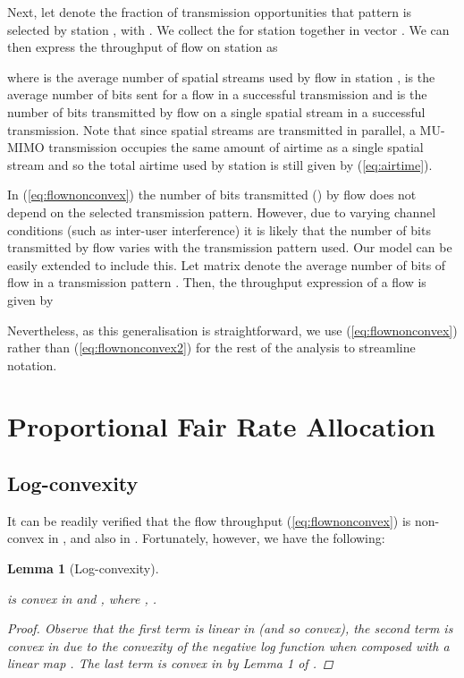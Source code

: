 \documentclass[11pt]{amsart}
\newtheorem{lemma}{Lemma}
\begin{document}
Next, let  denote the fraction of transmission opportunities that pattern  is selected by station , with .  We collect the  for station  together in vector . We can then express the throughput of flow  on station  as 

where  is the average number of spatial streams used by flow  in station ,  is the average number of bits sent for a flow  in a successful transmission and  is the number of bits transmitted by flow  on a single spatial stream in a successful transmission. Note that since spatial streams are transmitted in parallel, a MU-MIMO transmission occupies the same amount of airtime as a single spatial stream and so the total airtime  used by station  is still given by (\ref{eq:airtime}).

In (\ref{eq:flownonconvex}) the number of bits transmitted () by flow  does not depend on the selected transmission pattern. However,  due to varying channel conditions (such as inter-user interference) it is  likely that the number of bits transmitted by flow  varies with the transmission pattern used.  Our model can be easily extended to include this.  Let matrix  denote the average number of bits of flow  in a transmission pattern . Then, the throughput expression of a flow  is given by

Nevertheless, as this generalisation is straightforward, we use (\ref{eq:flownonconvex}) rather than (\ref{eq:flownonconvex2}) for the rest of the analysis to streamline notation.

\section{Proportional Fair Rate Allocation}
\subsection{Log-convexity}

It can be readily verified that the flow throughput (\ref{eq:flownonconvex}) is non-convex in , and also in .   Fortunately, however, we have the following:
\begin{lemma}[Log-convexity]\label{lem:convexity}

is convex in  and , where , .
\begin{proof}
Observe that the first term is linear in  (and so convex), the second term is convex in  due to the convexity of the negative log function when composed with a linear map \cite{boyd2004convex}. The last term is convex in   by Lemma 1 of \cite{5910091}. 
\end{proof}
\end{lemma}
\end{document}
